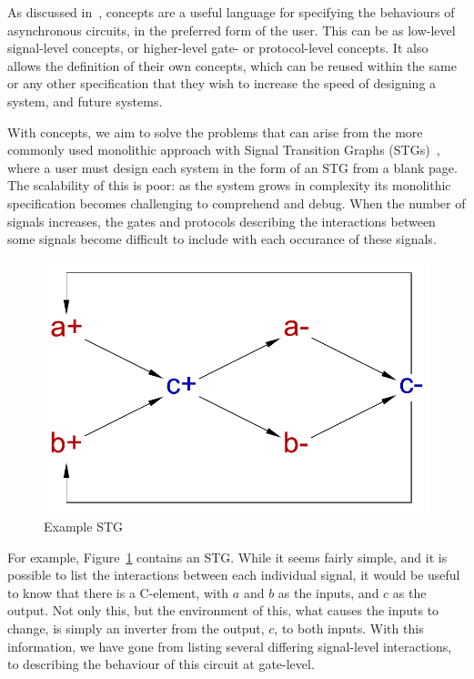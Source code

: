 \documentclass[british,conference,compsoc]{IEEEtran}
\begin{document}
As discussed in~\cite{2015_Beaumont_MEMOCODE}, concepts are a useful language 
for specifying the behaviours of asynchronous circuits, in the preferred form 
of the user. This can be as low-level signal-level concepts, or higher-level 
gate- or protocol-level concepts. It also allows the definition of their own 
concepts, which can be reused within the same or any other specification that 
they wish to increase the speed of designing a system, and future systems. 

With concepts, we aim to solve the problems that can arise from the more 
commonly used monolithic approach with Signal Transition Graphs (STGs)~\cite{Chu_1987_phd}\cite{Rosenblum_1985_tpn},
where a user must design each system in the 
form of an STG from a blank page. The scalability of this is poor: as the 
system grows in complexity its monolithic specification becomes challenging to 
comprehend and debug. When the number of signals increases, the gates and 
protocols describing the interactions between some signals become difficult to
include with each occurance of these signals. 

\begin{figure}[h]
\vspace{-3mm}
\begin{centering}
\includegraphics[scale=0.3]{Images/cElement-stg.pdf}
\par\end{centering}
\protect\caption{\label{fig:cElement-stg} Example STG}
\vspace{-6mm}
\end{figure}

For example, Figure~\ref{fig:cElement-stg} contains an STG. 
While it seems fairly simple, and it is possible to list the interactions between each
individual signal, it would be useful to know that there is a C-element, with $a$ and $b$ as
the inputs, and $c$ as the output. Not only this, but the environment of this, what 
causes the inputs to change, is simply an inverter from the output, $c$, to both inputs. 
With this information, we have gone from listing several differing signal-level interactions,
to describing the behaviour of this circuit at gate-level. 
\end{document}
